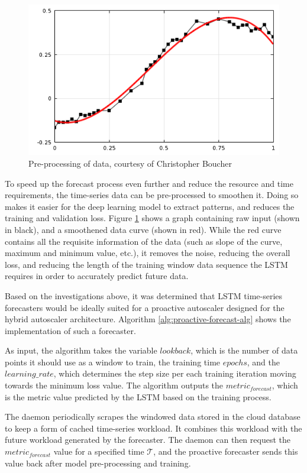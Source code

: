 \begin{figure}[htb]
    \centering
    \caption{Pre-processing of data, courtesy of Christopher Boucher \cite{comsolcurvefitting}}
    \label{fig:data-pre-process}
    \includegraphics[width=0.6\linewidth]{Figures/Data-Pre-Processing.png}
\end{figure}

To speed up the forecast process even further and reduce the resource and time requirements, the time-series data can be pre-processed to smoothen it. Doing so makes it easier for the deep learning model to extract patterns, and reduces the training and validation loss. Figure \ref{fig:data-pre-process} shows a graph containing raw input (shown in black), and a smoothened data curve (shown in red). While the red curve contains all the requisite information of the data (such as slope of the curve, maximum and minimum value, etc.), it removes the noise, reducing the overall loss, and reducing the length of the training window data sequence the LSTM requires in order to accurately predict future data.\par

Based on the investigations above, it was determined that LSTM time-series forecasters would be ideally suited for a proactive autoscaler designed for the hybrid autoscaler architecture. Algorithm \ref{alg:proactive-forecast-alg} shows the implementation of such a forecaster.\par

As input, the algorithm takes the variable $lookback$, which is the number of data points it should use as a window to train, the training time $epochs$, and the $learning\_rate$, which determines the step size per each training iteration moving towards the minimum loss value. The algorithm outputs the $metric_{forecast}$, which is the metric value predicted by the LSTM based on the training process.\par

The daemon periodically scrapes the windowed data stored in the cloud database to keep a form of cached time-series workload. It combines this workload with the future workload generated by the forecaster. The daemon can then request the $metric_{forecast}$ value for a specified time $\mathcal{T}$, and the proactive forecaster sends this value back after model pre-processing and training.\par

